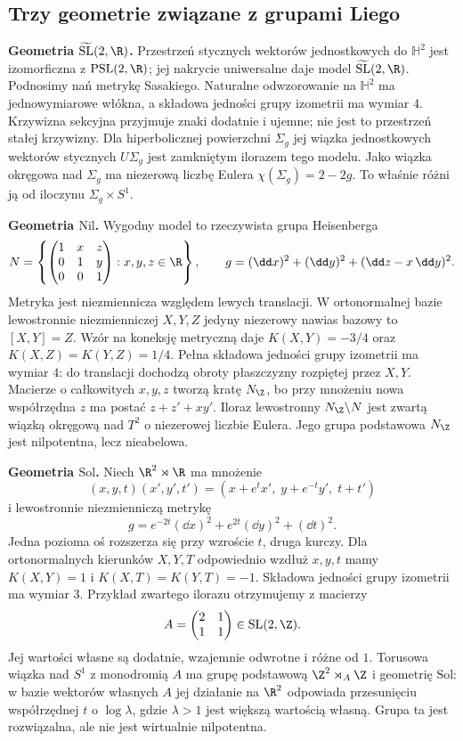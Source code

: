 \subsection*{Trzy geometrie związane z grupami Liego}

\textbf{Geometria $\widetilde{\mathrm{SL}}(2,\R)$.}
Przestrzeń stycznych wektorów jednostkowych do
$\mathbb H^2$ jest izomorficzna z $\mathrm{PSL}(2,\R)$;
jej nakrycie uniwersalne daje model
$\widetilde{\mathrm{SL}}(2,\R)$.
Podnosimy nań metrykę Sasakiego. Naturalne odwzorowanie
na $\mathbb H^2$ ma jednowymiarowe włókna, a składowa
jedności grupy izometrii ma wymiar $4$.
Krzywizna sekcyjna przyjmuje znaki dodatnie i ujemne;
nie jest to przestrzeń stałej krzywizny.
Dla hiperbolicznej powierzchni $\Sigma_g$ jej wiązka
jednostkowych wektorów stycznych $U\Sigma_g$ jest zamkniętym
ilorazem tego modelu. Jako wiązka okręgowa nad $\Sigma_g$
ma niezerową liczbę Eulera $\chi(\Sigma_g)=2-2g$.
To właśnie różni ją od iloczynu $\Sigma_g\times S^1$.

\textbf{Geometria $\mathrm{Nil}$.}
Wygodny model to rzeczywista grupa Heisenberga
\[
 N=\left\{\begin{pmatrix}1&x&z\\0&1&y\\0&0&1\end{pmatrix}
 :x,y,z\in\R\right\},
 \qquad
 g=(\dd x)^2+(\dd y)^2+(\dd z-x\,\dd y)^2.
\]
Metryka jest niezmiennicza względem lewych translacji.
W ortonormalnej bazie lewostronnie niezmienniczej $X,Y,Z$
jedyny niezerowy nawias bazowy to $[X,Y]=Z$. Wzór na koneksję
metryczną daje $K(X,Y)=-3/4$ oraz
$K(X,Z)=K(Y,Z)=1/4$. Pełna składowa jedności grupy
izometrii ma wymiar $4$: do translacji dochodzą obroty
płaszczyzny rozpiętej przez $X,Y$.
Macierze o całkowitych $x,y,z$ tworzą kratę $N_{\Z}$,
bo przy mnożeniu nowa współrzędna $z$ ma postać $z+z'+xy'$.
Iloraz lewostronny $N_{\Z}\backslash N$ jest zwartą wiązką
okręgową nad $T^2$
o niezerowej liczbie Eulera. Jego grupa podstawowa
$N_{\Z}$ jest nilpotentna, lecz nieabelowa.

\textbf{Geometria $\mathrm{Sol}$.}
Niech $\R^2\rtimes\R$ ma mnożenie
\[
 (x,y,t)(x',y',t')=
 (x+e^t x',\;y+e^{-t}y',\;t+t')
\]
i lewostronnie niezmienniczą metrykę
\[
 g=e^{-2t}(\dd x)^2+e^{2t}(\dd y)^2+(\dd t)^2.
\]
Jedna pozioma oś rozszerza się przy wzroście $t$,
druga kurczy. Dla ortonormalnych kierunków $X,Y,T$
odpowiednio wzdłuż $x,y,t$ mamy
$K(X,Y)=1$ i $K(X,T)=K(Y,T)=-1$.
Składowa jedności grupy izometrii ma wymiar $3$.
Przykład zwartego ilorazu otrzymujemy z macierzy
\[
 A=\begin{pmatrix}2&1\\1&1\end{pmatrix}\in\mathrm{SL}(2,\Z).
\]
Jej wartości własne są dodatnie, wzajemnie odwrotne i różne od $1$.
Torusowa wiązka nad $S^1$ z monodromią $A$ ma grupę podstawową
$\Z^2\rtimes_A\Z$ i geometrię $\mathrm{Sol}$: w bazie
wektorów własnych $A$ jej działanie na $\R^2$ odpowiada
przesunięciu współrzędnej $t$ o $\log\lambda$, gdzie
$\lambda>1$ jest większą wartością własną.
Grupa ta jest rozwiązalna, ale nie jest wirtualnie nilpotentna.


